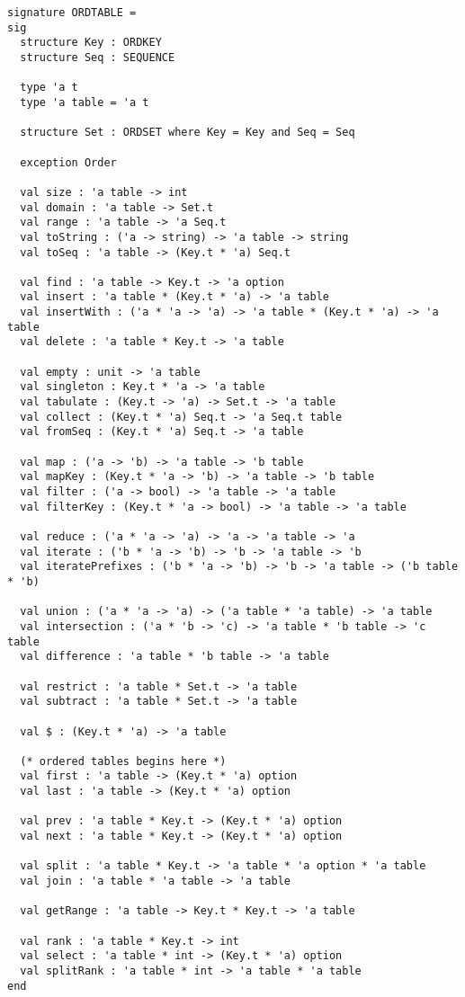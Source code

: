 \begin{cluster}
\label{grp:grm:ordtable-interface::signature}

\begin{gram}
\label{grm:ordtable-interface::signature}
\begin{verbatim}
signature ORDTABLE =
sig
  structure Key : ORDKEY
  structure Seq : SEQUENCE

  type 'a t
  type 'a table = 'a t

  structure Set : ORDSET where Key = Key and Seq = Seq

  exception Order

  val size : 'a table -> int
  val domain : 'a table -> Set.t
  val range : 'a table -> 'a Seq.t
  val toString : ('a -> string) -> 'a table -> string
  val toSeq : 'a table -> (Key.t * 'a) Seq.t

  val find : 'a table -> Key.t -> 'a option
  val insert : 'a table * (Key.t * 'a) -> 'a table
  val insertWith : ('a * 'a -> 'a) -> 'a table * (Key.t * 'a) -> 'a table
  val delete : 'a table * Key.t -> 'a table

  val empty : unit -> 'a table
  val singleton : Key.t * 'a -> 'a table
  val tabulate : (Key.t -> 'a) -> Set.t -> 'a table
  val collect : (Key.t * 'a) Seq.t -> 'a Seq.t table
  val fromSeq : (Key.t * 'a) Seq.t -> 'a table

  val map : ('a -> 'b) -> 'a table -> 'b table
  val mapKey : (Key.t * 'a -> 'b) -> 'a table -> 'b table
  val filter : ('a -> bool) -> 'a table -> 'a table
  val filterKey : (Key.t * 'a -> bool) -> 'a table -> 'a table

  val reduce : ('a * 'a -> 'a) -> 'a -> 'a table -> 'a
  val iterate : ('b * 'a -> 'b) -> 'b -> 'a table -> 'b
  val iteratePrefixes : ('b * 'a -> 'b) -> 'b -> 'a table -> ('b table * 'b)

  val union : ('a * 'a -> 'a) -> ('a table * 'a table) -> 'a table
  val intersection : ('a * 'b -> 'c) -> 'a table * 'b table -> 'c table
  val difference : 'a table * 'b table -> 'a table

  val restrict : 'a table * Set.t -> 'a table
  val subtract : 'a table * Set.t -> 'a table

  val $ : (Key.t * 'a) -> 'a table

  (* ordered tables begins here *)
  val first : 'a table -> (Key.t * 'a) option
  val last : 'a table -> (Key.t * 'a) option

  val prev : 'a table * Key.t -> (Key.t * 'a) option
  val next : 'a table * Key.t -> (Key.t * 'a) option

  val split : 'a table * Key.t -> 'a table * 'a option * 'a table
  val join : 'a table * 'a table -> 'a table

  val getRange : 'a table -> Key.t * Key.t -> 'a table

  val rank : 'a table * Key.t -> int
  val select : 'a table * int -> (Key.t * 'a) option
  val splitRank : 'a table * int -> 'a table * 'a table
end
\end{verbatim}

\end{gram}
\end{cluster}


